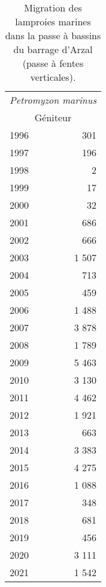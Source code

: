 \begin{table}[ht]
\centering
\begin{tabular}{lr}
  \toprule
  \multicolumn{2}{c}{\textit{Petromyzon marinus}}  \\ 
						\multicolumn{2}{c}{Géniteur} \\
                        \midrule
1996 & 301 \\ 
  1997 & 196 \\ 
  1998 & 2 \\ 
  1999 & 17 \\ 
  2000 & 32 \\ 
  2001 & 686 \\ 
  2002 & 666 \\ 
  2003 & 1 507 \\ 
  2004 & 713 \\ 
  2005 & 459 \\ 
  2006 & 1 488 \\ 
  2007 & 3 878 \\ 
  2008 & 1 789 \\ 
  2009 & 5 463 \\ 
  2010 & 3 130 \\ 
  2011 & 4 462 \\ 
  2012 & 1 921 \\ 
  2013 & 663 \\ 
  2014 & 3 383 \\ 
  2015 & 4 275 \\ 
  2016 & 1 088 \\ 
  2017 & 348 \\ 
  2018 & 681 \\ 
  2019 & 456 \\ 
  2020 & 3 111 \\ 
  2021 & 1 542 \\ 
   \bottomrule
\end{tabular}
\caption{Migration des lamproies marines dans la passe à bassins du barrage
				d'Arzal (passe à fentes verticales).} 
\label{table_bilanannuel_lpm}
\end{table}
